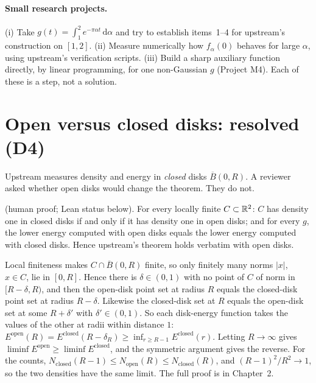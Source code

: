 \paragraph{Small research projects.}
(i) Take $g(t)=\int_1^2e^{-\pi\alpha t}\,\mathrm{d}\alpha$ and try to establish items~1--4 for upstream's construction
on $[1,2]$. (ii) Measure numerically how $f_\alpha(0)$ behaves for large $\alpha$, using upstream's verification
scripts. (iii) Build a sharp auxiliary function directly, by linear programming, for one non-Gaussian $g$
(Project M4). Each of these is a step, not a solution.

\section{Open versus closed disks: resolved (D4)}
\label{ch5:sec:disks}

Upstream measures density and energy in \emph{closed} disks $\overline B(0,R)$. A reviewer asked whether open disks
would change the theorem. They do not.

\begin{proposition}[D4]\label{ch5:prop:d4}
\tierC{} (human proof; Lean status below). For every locally finite $C\subset\mathbb{R}^2$: $C$ has density one in closed
disks if and only if it has density one in open disks; and for every $g$, the lower energy computed with open disks
equals the lower energy computed with closed disks. Hence upstream's theorem holds verbatim with open disks.
\end{proposition}

\begin{humanproof}
Local finiteness makes $C\cap\overline B(0,R)$ finite, so only finitely many norms $|x|$, $x\in C$, lie in $[0,R]$.
Hence there is $\delta\in(0,1)$ with no point of $C$ of norm in $[R-\delta,R)$, and then the open-disk point set at
radius $R$ equals the closed-disk point set at radius $R-\delta$. Likewise the closed-disk set at $R$ equals the
open-disk set at some $R+\delta'$ with $\delta'\in(0,1)$. So each disk-energy function takes the values of the
other at radii within distance $1$: $E^{\mathrm{open}}(R)=E^{\mathrm{closed}}(R-\delta_R)\ge
\inf_{r\ge R-1}E^{\mathrm{closed}}(r)$. Letting $R\to\infty$ gives $\liminf E^{\mathrm{open}}\ge\liminf
E^{\mathrm{closed}}$, and the symmetric argument gives the reverse. For the counts,
$N_{\mathrm{closed}}(R-1)\le N_{\mathrm{open}}(R)\le N_{\mathrm{closed}}(R)$, and $(R-1)^2/R^2\to1$, so the two densities
have the same limit. The full proof is in Chapter~2.
\end{humanproof}

